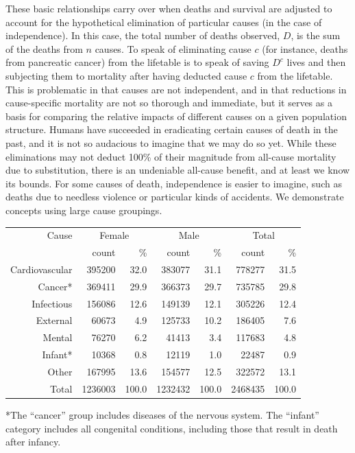 \documentclass{article}
\begin{document}
These basic relationships carry over when deaths and survival are adjusted to
account for the hypothetical elimination of particular causes (in the case of
independence). In this case, the total number of deaths observed, $D$, is the
sum of the deaths from $n$ causes. To speak of eliminating cause $c$ (for
instance, deaths from pancreatic cancer) from the lifetable is to speak of
saving $D^{c}$ lives and then subjecting them to mortality after
having deducted cause $c$ from the lifetable.
This is problematic in that causes are not independent, and in that
reductions in cause-specific mortality are not so thorough and immediate, but it
serves as a basis for comparing the relative impacts of different causes on
a given population structure. Humans have succeeded in eradicating certain
causes of death in the past, and it
is not so audacious to imagine that we may do so yet. While these
eliminations may not deduct 100\% of their magnitude from all-cause mortality
due to substitution, there is an undeniable all-cause benefit, and at least 
we know its bounds. For some causes of death, independence is easier to imagine,
such as deaths due to needless violence or particular kinds of accidents. We
demonstrate concepts using large cause groupings.

\vspace{2em}
\begin{minipage}{\linewidth}
\centering
{}
\label{tab:counts}
\begin{tabular}{rrrrrrr}
\hline
Cause &\multicolumn{2}{c}{ Female }&\multicolumn{2}{c}{ Male
}&\multicolumn{2}{c}{ Total}
\\
 & count & \% & count & \% & count & \% \\ 
  \hline
   Cardiovascular & 395200 & 32.0 & 383077 & 31.1 & 778277 & 31.5 \\ 
Cancer* & 369411 & 29.9 & 366373 & 29.7 & 735785 & 29.8 \\ 
  Infectious & 156086 & 12.6 & 149139 & 12.1 & 305226 & 12.4 \\ 
  External & 60673 & 4.9 & 125733 & 10.2 & 186405 & 7.6 \\ 
    Mental & 76270 & 6.2 & 41413 & 3.4 & 117683 & 4.8 \\ 
  Infant* & 10368 & 0.8 & 12119 & 1.0 & 22487 & 0.9 \\ 
  Other & 167995 & 13.6 & 154577 & 12.5 & 322572 & 13.1 \\ 
  \hline
  Total & 1236003 & 100.0 & 1232432 & 100.0 & 2468435 & 100.0 \\
   \hline
\end{tabular}\par
\raggedright\small
*The ``cancer'' group includes diseases of the nervous
system. The ``infant'' category includes all congenital conditions, including
those that result in death after infancy. 
\end{minipage}
\vspace{2em}
\end{document}

